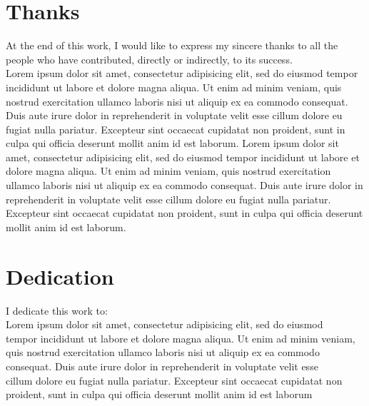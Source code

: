 \chapter*{Thanks}
\thispagestyle{empty}
%
At the end of this work, I would like to express my sincere thanks to
all the people who have contributed, directly or indirectly, to its success. ~\\

Lorem ipsum dolor sit amet, consectetur adipisicing elit, sed do eiusmod
tempor incididunt ut labore et dolore magna aliqua. Ut enim ad minim veniam,
quis nostrud exercitation ullamco laboris nisi ut aliquip ex ea commodo
consequat. Duis aute irure dolor in reprehenderit in voluptate velit esse
cillum dolore eu fugiat nulla pariatur. Excepteur sint occaecat cupidatat non
proident, sunt in culpa qui officia deserunt mollit anim id est laborum. Lorem ipsum dolor sit amet, consectetur adipisicing elit, sed do eiusmod
tempor incididunt ut labore et dolore magna aliqua. Ut enim ad minim veniam,
quis nostrud exercitation ullamco laboris nisi ut aliquip ex ea commodo
consequat. Duis aute irure dolor in reprehenderit in voluptate velit esse
cillum dolore eu fugiat nulla pariatur. Excepteur sint occaecat cupidatat non
proident, sunt in culpa qui officia deserunt mollit anim id est laborum.
\chapter*{Dedication}
\thispagestyle{empty}
%
\begin{center}
  I dedicate this work to: ~\\
  


  Lorem ipsum dolor sit amet, consectetur adipisicing elit, sed do eiusmod ~\\
  tempor incididunt ut labore et dolore magna aliqua. Ut enim ad minim veniam, ~\\
  quis nostrud exercitation ullamco laboris nisi ut aliquip ex ea commodo ~\\
  consequat. Duis aute irure dolor in reprehenderit in voluptate velit esse ~\\
  cillum dolore eu fugiat nulla pariatur. Excepteur sint occaecat cupidatat non ~\\
  proident, sunt in culpa qui officia deserunt mollit anim id est laborum ~\\
\end{center}
%
%
%
%
%
%
%
\cleardoublepage%
